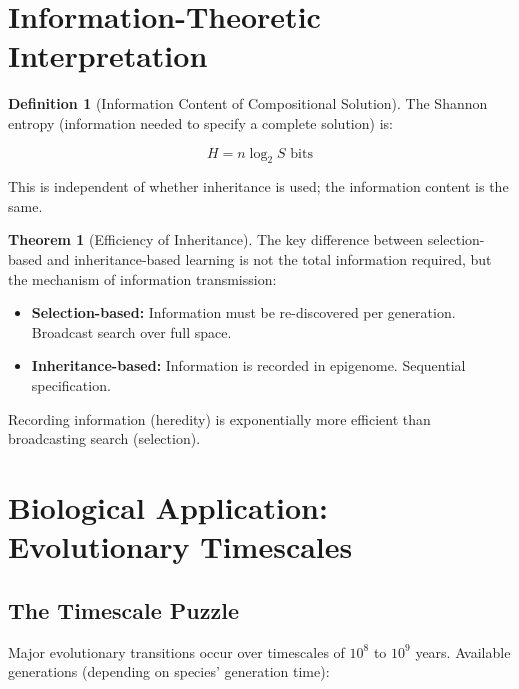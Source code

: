 \documentclass[11pt]{article}
\theoremstyle{definition}
\newtheorem{theorem}{Theorem}
\newtheorem{definition}{Definition}
\begin{document}
\section{Information-Theoretic Interpretation}

\begin{definition}[Information Content of Compositional Solution]

The Shannon entropy (information needed to specify a complete solution) is:

\begin{equation}
H = n \log_2 S \text{ bits}
\end{equation}

This is independent of whether inheritance is used; the information content is the same.

\end{definition}

\begin{theorem}[Efficiency of Inheritance]

The key difference between selection-based and inheritance-based learning is not the total information required, but the mechanism of information transmission:

\begin{itemize}
\item \textbf{Selection-based:} Information must be re-discovered per generation. Broadcast search over full space.
\item \textbf{Inheritance-based:} Information is recorded in epigenome. Sequential specification.
\end{itemize}

Recording information (heredity) is exponentially more efficient than broadcasting search (selection).

\end{theorem}

\section{Biological Application: Evolutionary Timescales}

\subsection{The Timescale Puzzle}

Major evolutionary transitions occur over timescales of $10^8$ to $10^9$ years. Available generations (depending on species' generation time):
\end{document}
